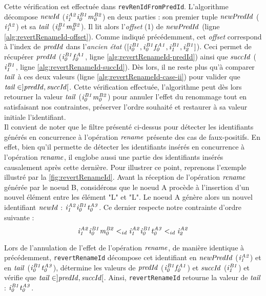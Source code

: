 Cette vérification est effectuée dans \texttt{revRenIdFromPredId}.
L'algorithme décompose $\mathit{newId}$ (\eg $\mathit{i}^{\mathit{A2}}_{\mathit{1}}\mathit{i}^{\mathit{B1}}_{\mathit{0}}\mathit{m}^{\mathit{B2}}_{\mathit{0}}$) en deux parties : son premier tuple $\mathit{newPredId}$ ($\mathit{i}^{\mathit{A2}}_{\mathit{1}}$) et sa $\mathit{tail}$ ($\mathit{i}^{\mathit{B1}}_{\mathit{0}}\mathit{m}^{\mathit{B2}}_{\mathit{0}}$).
Il lit alors l'\emph{offset} (1) de $\mathit{newPredId}$ (ligne \ref{alg:revertRenameId-offset}).
Comme indiqué précédemment, cet \emph{offset} correspond à l'index de $\mathit{predId}$ dans l'\emph{ancien état} ($[\mathit{i}^{\mathit{B1}}_{\mathit{0}},\mathit{i}^{\mathit{B1}}_{\mathit{0}}\mathit{f}^{\mathit{A1}}_{\mathit{0}},\mathit{i}^{\mathit{B1}}_{\mathit{1}},\mathit{i}^{\mathit{B1}}_{\mathit{2}}]$).
Ceci permet de récupérer $\mathit{predId}$ ($\mathit{i}^{\mathit{B1}}_{\mathit{0}}\mathit{f}^{\mathit{A1}}_{\mathit{0}}$, ligne \ref{alg:revertRenameId-predId}) ainsi que $\mathit{succId}$ ($\mathit{i}^{\mathit{B1}}_{\mathit{1}}$, ligne \ref{alg:revertRenameId-succId}).
Dès lors, il ne reste plus qu'à comparer $\mathit{tail}$ à ces deux valeurs (ligne \ref{alg:revertRenameId-case-ii}) pour valider que $\mathit{tail} \in ]\mathit{predId},\mathit{succId}[$.
Cette vérification effectuée, l'algorithme peut dès lors retourner la valeur $\mathit{tail}$ ($\mathit{i}^{\mathit{B1}}_{\mathit{0}}\mathit{m}^{\mathit{B2}}_{\mathit{0}}$) pour annuler l'effet du renommage tout en satisfaisant nos contraintes, \ie préserver l'ordre souhaité et restaurer à sa valeur initiale l'identifiant.
\\
Il convient de noter que le filtre présenté ci-dessus pour détecter les identifiants générés en concurrence à l'opération $\mathit{rename}$ présente des cas de faux-positifs.
En effet, bien qu'il permette de détecter les identifiants insérés en concurrence à l'opération $\mathit{rename}$, il englobe aussi une partie des identifiants insérés causalement après cette dernière.
Pour illustrer ce point, reprenons l'exemple illustré par la \autoref{fig:revertRenameId}.
Avant la réception de l'opération $\mathit{rename}$ générée par le noeud B, considérons que le noeud A procède à l'insertion d'un nouvel élément entre les élément "L" et "L".
Le noeud A génère alors un nouvel identifiant $\mathit{newId}$ : $\mathit{i}^{\mathit{A2}}_{\mathit{1}}\mathit{i}^{\mathit{B1}}_{\mathit{0}}\mathit{t}^{\mathit{A3}}_{\mathit{0}}$.
Ce dernier respecte notre contrainte d'ordre suivante :
\[ \mathit{i}^{\mathit{A2}}_{\mathit{1}}\mathit{i}^{\mathit{B1}}_{\mathit{0}}\mathit{m}^{\mathit{B2}}_{\mathit{0}} <_{id} \mathit{i}^{\mathit{A2}}_{\mathit{1}}\mathit{i}^{\mathit{B1}}_{\mathit{0}}\mathit{t}^{\mathit{A3}}_{\mathit{0}} <_{id} \mathit{i}^{\mathit{A2}}_{\mathit{2}} \]

Lors de l'annulation de l'effet de l'opération $\mathit{rename}$, de manière identique à précédemment, \texttt{revertRenameId} décompose cet identifiant en $\mathit{newPredId}$ ($\mathit{i}^{\mathit{A2}}_{\mathit{1}}$) et en $\mathit{tail}$ ($\mathit{i}^{\mathit{B1}}_{\mathit{0}}\mathit{t}^{\mathit{A3}}_{\mathit{0}}$), détermine les valeurs de $\mathit{predId}$ ($\mathit{i}^{\mathit{B1}}_{\mathit{0}}\mathit{f}^{\mathit{A1}}_{\mathit{0}}$) et $\mathit{succId}$ ($\mathit{i}^{\mathit{B1}}_{\mathit{1}}$) et vérifie que $\mathit{tail} \in ]\mathit{predId},\mathit{succId}[$.
Ainsi, \texttt{revertRenameId} retourne la valeur de $\mathit{tail}$ : $\mathit{i}^{\mathit{B1}}_{\mathit{0}}\mathit{t}^{\mathit{A3}}_{\mathit{0}}$.

